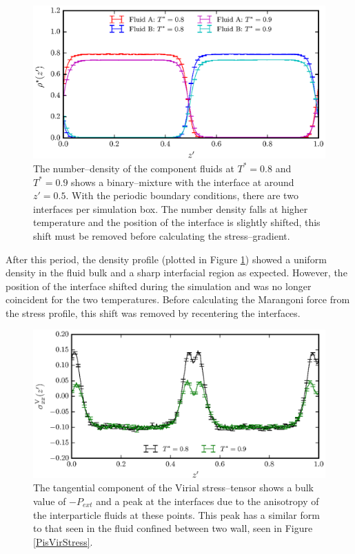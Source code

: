 \begin{figure}[h]
\centering
\includegraphics[scale=0.8]{Period10Rho}
\caption{The number--density of the component fluids at $T^{*}=0.8$ and $T^{*}=0.9$ shows a binary--mixture with the interface at around $z'=0.5$.
With the periodic boundary conditions, there are two interfaces per simulation box.
The number density falls at higher temperature and the position of the interface is slightly shifted, this shift must be removed before calculating the stress--gradient.}
\label{Period10Rho}
\end{figure}
After this period, the density profile (plotted in Figure \ref{Period10Rho}) showed a uniform density in the fluid bulk and a sharp interfacial region as expected.
However, the position of the interface shifted during the simulation and was no longer coincident for the two temperatures.
Before calculating the Marangoni force from the stress profile, this shift was removed by recentering the interfaces.
\FloatBarrier

\begin{figure}[h]
\centering
\includegraphics[scale=0.8]{Period10VirStress}
\caption{The tangential component of the Virial stress--tensor shows a bulk value of $-P_{ext}$ and a peak at the interfaces due to the anisotropy of the interparticle fluids at these points.
This peak has a similar form to that seen in the fluid confined between two wall, seen in Figure \ref{PisVirStress}.
}
\label{Period10VirStress}
\end{figure}

